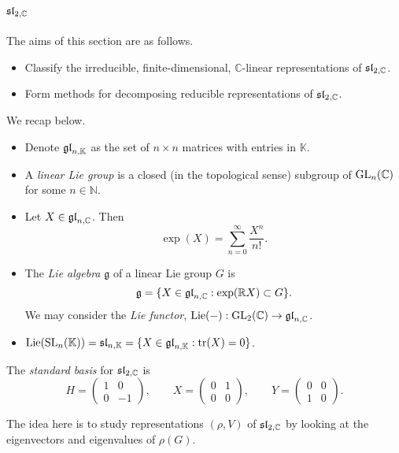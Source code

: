 \section{$\sltwo$}

The aims of this section are as follows.
\begin{itemize}
    \item Classify the irreducible, finite-dimensional, $\mathbb C$-linear representations of $\sltwo$.
    \item Form methods for decomposing reducible representations of $\sltwo$.
\end{itemize}

We recap below.

\begin{itemize}
    \item Denote $\gl[n, \mathbb K]$ as the set of $n \times n$ matrices with entries in $\mathbb K$.
    \item A \emph{linear Lie group} is a closed (in the topological sense) subgroup of $\GL_n(\mathbb C)$ for some $n \in \mathbb N$.
    \item Let $X \in \gl[n, \mathbb C]$. Then
          \[ \exp(X) = \sum_{n=0}^\infty \frac{X^n}{n!}. \]
    \item The \emph{Lie algebra} $\mathfrak g$ of a linear Lie group $G$ is
          \[ \mathfrak g = \{X \in \gl[n, \mathbb C]: \exp(\mathbb RX) \subset G\}. \]
          We may consider the \emph{Lie functor}, $\Lie(-): \GL_2(\mathbb C) \to \gl[n, \mathbb C]$.
    \item $\Lie(\SL_n(\mathbb K)) = \sl[n, \mathbb K] = \{X \in \gl[n, \mathbb K]: \tr(X) = 0\}$.
\end{itemize}

The \emph{standard basis} for $\sltwo$ is
\[
    H =
    \begin{pmatrix}
        1 & 0 \\ 0 & -1
    \end{pmatrix}, \qquad
    X =
    \begin{pmatrix}
        0 & 1 \\ 0 & 0
    \end{pmatrix}, \qquad
    Y =
    \begin{pmatrix}
        0 & 0 \\ 1 & 0
    \end{pmatrix}.
\]

The idea here is to study representations $(\rho, V)$ of $\sltwo$ by looking at the eigenvectors and eigenvalues of $\rho(G)$.

